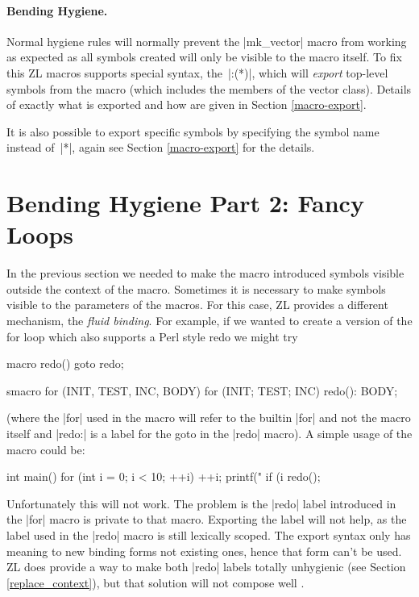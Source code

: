 \paragraph{Bending Hygiene.}
\label{macro-export-intro}

Normal hygiene rules will normally prevent the |mk_vector| macro from
working as expected as all symbols created will only be visible to the
macro itself.  To fix this ZL macros supports special syntax,
the~|:(*)|, which will \textit{export} top-level symbols from the
macro (which includes the members of the vector class).  Details of
exactly what is exported and how are given in Section
\ref{macro-export}.

It is also possible to export specific symbols by specifying the symbol
name instead of~|*|, again see Section \ref{macro-export} for the details.

\section{Bending Hygiene Part 2: Fancy Loops}
\label{fluid-intro}

In the previous section we needed to make the macro introduced symbols
visible outside the context of the macro.  Sometimes it is necessary
to make symbols visible to the parameters of the macros.  For this
case, ZL provides a different mechanism, the \textit{fluid binding}.
For example, if we wanted to create a version of the for loop which
also supports a Perl style redo we might try
\begin{code}
macro redo() {goto redo;}

smacro for (INIT, TEST, INC, BODY) {
  for (INIT; TEST; INC) {
    redo():
    BODY;
  }
}
\end{code}
(where the |for| used in the macro will refer to the builtin |for| and
not the macro itself and |redo:| is a label for the goto in the |redo|
macro).  A simple usage of the macro could be:

\begin{code}
int main() {
  for (int i = 0; i < 10; ++i) {
    ++i;
    printf("%
    if (i %
      redo();
  }
}
\end{code}

Unfortunately this will not work.  The problem is the |redo| label
introduced in the |for| macro is private to that macro.  Exporting the
label will not help, as the label used in the |redo| macro is still
lexically scoped.  The export syntax only has meaning to new binding
forms not existing ones, hence that form can't be used.  ZL does provide a
way to make both |redo| labels totally unhygienic (see Section
\ref{replace_context}), but that solution will not compose well \cite{syn-parm}.


